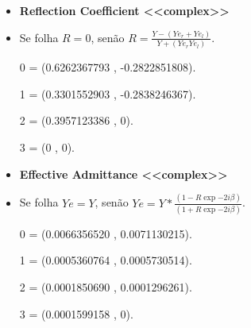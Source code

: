 \documentclass[10pt]{beamer}
\theoremstyle{remark}
\theoremstyle{definition}
\begin{document}
\begin{frame}[allowframebreaks]
\begin{itemize}
\end{itemize}

\framebreak

\begin{itemize}
\item \textbf{Reflection Coefficient <<complex>>}
\item Se folha $ R = 0 $, senão $ R = \frac{Y - (Ye_r + Ye_l)}{Y + (Ye_r Ye_l)}$.
\item [0] = (0.6262367793  ,  -0.2822851808).
\item [1] = (0.3301552903  ,  -0.2838246367).
\item [2] = (0.3957123386  ,  0).
\item [3] = (0             ,  0).

\end{itemize}

\framebreak

\begin{itemize}
\item \textbf{Effective Admittance <<complex>>}
\item Se folha $ Ye = Y $, senão $ Ye = Y * \frac{(1 - R\exp{-2i\beta})}{(1 + R\exp{-2i\beta})}$.
\item [0] = (0.0066356520  ,  0.0071130215).
\item [1] = (0.0005360764  ,  0.0005730514).
\item [2] = (0.0001850690  ,  0.0001296261).
\item [3] = (0.0001599158  ,  0).

\end{itemize}
	
	
	
\end{frame}
\end{document}
